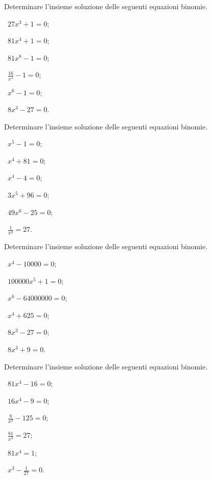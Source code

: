 \begin{esercizio}[\Ast]
 \label{ese:5.13}
Determinare l'insieme soluzione delle seguenti equazioni binomie.
\begin{multicols}{3}
 \begin{enumeratea}
 \item~$27x^3+1=0$;
 \item~$81x^4+1=0$;
 \item~$81x^8-1=0$;
 \item~$\frac{16}{x^4}-1=0$;
 \item~$x^6-1=0$;
 \item~$8x^3-27=0$.
 \end{enumeratea}
 \end{multicols}
\end{esercizio}

\begin{esercizio}[\Ast]
 \label{ese:5.14}
Determinare l'insieme soluzione delle seguenti equazioni binomie.
\begin{multicols}{3}
 \begin{enumeratea}
 \item~$x^5-1=0$;
 \item~$x^4+81=0$;
 \item~$x^4-4=0$;
 \item~$3x^5+96=0$;
 \item~$49x^6-25=0$;
 \item~$\frac 1{x^3}=27$.
 \end{enumeratea}
 \end{multicols}
\end{esercizio}
\newpage
\begin{esercizio}[\Ast]
 \label{ese:5.15}
Determinare l'insieme soluzione delle seguenti equazioni binomie.
\begin{multicols}{3}
 \begin{enumeratea}
 \item~$x^4-10000=0$;
 \item~$100000x^5+1=0$;
 \item~$x^6-64000000=0$;
 \item~$x^4+625=0$;
 \item~$8x^3-27=0$;
 \item~$8x^3+9=0$.
 \end{enumeratea}
 \end{multicols}
\end{esercizio}

\begin{esercizio}[\Ast]
 \label{ese:5.16}
Determinare l'insieme soluzione delle seguenti equazioni binomie.
\begin{multicols}{3}
 \begin{enumeratea}
 \item~$81x^4-16=0$;
 \item~$16x^4-9=0$;
 \item~$\frac 8{x^3}-125=0$;
 \item~$\frac{81}{x^3}=27$;
 \item~$81x^4=1$;
 \item~$x^3-\frac 1{27}=0$.
 \end{enumeratea}
 \end{multicols}
\end{esercizio}

